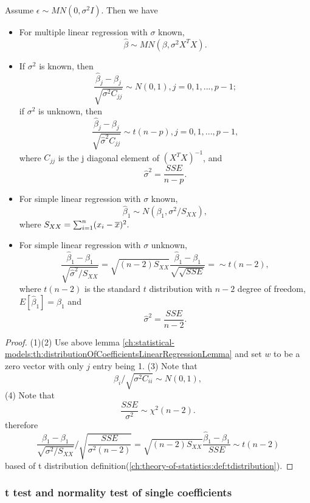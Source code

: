 \begin{refsection}
\begin{theorem}\cite[93]{montgomery2012introduction}\label{ch:statistical-models:th:distributionOfCoefficientsLinearRegression}
	Assume $\epsilon \sim MN(0,\sigma^2 I)$. Then we have
	\begin{itemize}
		\item For multiple linear regression with $\sigma$ known, $$\hat{\beta} \sim MN(\beta,\sigma^2 X^TX).$$
		\item If $\sigma^2$ is known, then
		$$\frac{\hat{\beta}_j - \beta_j}{\sqrt{\sigma^2C_{jj}}} \sim N(0,1), j=0,1,...,p-1;$$
		if $\sigma^2$ is unknown, then
		$$\frac{\hat{\beta}_j - \beta_j}{\sqrt{\hat{\sigma}^2C_{jj}}}\sim t(n-p),j=0,1,...,p-1,$$
		where $C_{jj}$ is the j diagonal element of $(X^TX)^{-1}$, and $$\hat{\sigma}^2 = \frac{SSE}{n-p}.$$
		\item For simple linear regression with $\sigma$ known, $$\hat{\beta}_1 \sim N(\beta_1,\sigma^2/S_{XX}),$$ where
		$S_{XX} = \sum_{i=1}^n (x_i - \overline{x})^2.$
		\item For simple linear regression with $\sigma$ unknown, $$  \frac{\hat{\beta}_1 - \beta_{1}}{\sqrt{\hat{\sigma}^2/S_{XX}}} = \sqrt{(n-2)S_{XX}}\frac{\hat{\beta}_1 - \beta_{1}}{\sqrt{\sqrt{SSE}}} = \sim t(n-2),$$
		where $t(n-2)$ is the standard $t$ distribution with $n-2$ degree of freedom, $E[\hat{\beta}_1] = \beta_1$ and 
		$$\hat{\sigma}^2 = \frac{SSE}{n-2}.$$
	\end{itemize}	
\end{theorem}
\begin{proof}
	(1)(2)
	Use above lemma \autoref{ch:statistical-models:th:distributionOfCoefficientsLinearRegressionLemma} and set $w$ to be a zero vector with only $j$ entry being 1.
	(3) Note that
	$$\hat{\beta}_i/\sqrt{\sigma^2 C_{ii}} \sim N(0,1),$$
	(4) Note that $$\frac{SSE}{\sigma^2}\sim \chi^2(n-2).$$
	therefore
	$$ \frac{\hat{\beta}_1 - \beta_{1}}{\sqrt{\sigma^2/S_{XX}}}/\sqrt{\frac{SSE}{\sigma^2(n-2)}} = \sqrt{(n-2)S_{XX}}\frac{\hat{\beta}_1 - \beta_{1}}{SSE} \sim t(n-2)$$
	based of t distribution definition(\autoref{ch:theory-of-statistics:def:tdistribution}).
\end{proof}

\subsubsection{t test and normality test of single coefficients}




\end{refsection}
